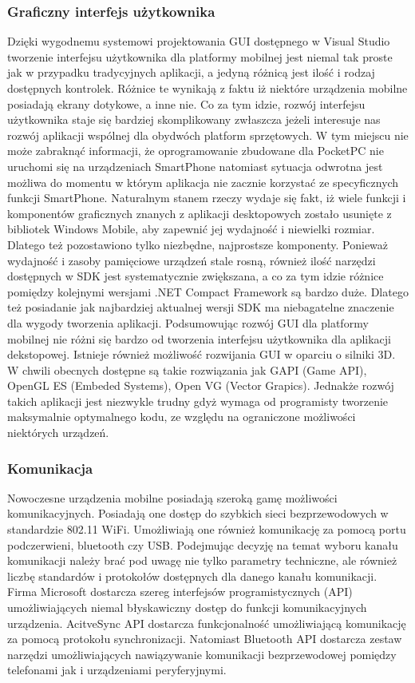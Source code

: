 \subsubsection{Graficzny interfejs użytkownika}
Dzięki wygodnemu systemowi projektowania GUI dostępnego w Visual Studio tworzenie
interfejsu użytkownika dla platformy mobilnej jest niemal tak proste jak w
przypadku tradycyjnych aplikacji, a jedyną różnicą jest ilość i rodzaj dostępnych
kontrolek. Różnice te wynikają z faktu iż niektóre urządzenia mobilne posiadają
ekrany dotykowe, a inne nie. Co za tym idzie, rozwój interfejsu użytkownika staje
się bardziej skomplikowany zwłaszcza jeżeli interesuje nas rozwój aplikacji
wspólnej dla obydwóch platform sprzętowych. W tym miejscu nie może zabraknąć
informacji, że oprogramowanie zbudowane dla PocketPC nie uruchomi się na
urządzeniach SmartPhone natomiast sytuacja odwrotna jest możliwa do momentu w
którym aplikacja nie zacznie korzystać ze specyficznych funkcji SmartPhone.
Naturalnym stanem rzeczy wydaje się fakt, iż wiele funkcji i komponentów
graficznych znanych z aplikacji desktopowych zostało usunięte z bibliotek Windows
Mobile, aby zapewnić jej wydajność i niewielki rozmiar. Dlatego też pozostawiono
tylko niezbędne, najprostsze komponenty. Ponieważ wydajność  i zasoby pamięciowe
urządzeń stale rosną, również ilość narzędzi dostępnych w SDK jest systematycznie
zwiększana, a co za tym idzie różnice pomiędzy kolejnymi wersjami .NET Compact
Framework są bardzo duże. Dlatego też posiadanie jak najbardziej aktualnej wersji
SDK ma niebagatelne znaczenie dla wygody tworzenia aplikacji. Podsumowując rozwój
GUI dla platformy mobilnej nie różni się bardzo od tworzenia interfejsu
użytkownika dla aplikacji dekstopowej. Istnieje również możliwość rozwijania GUI
w oparciu o silniki 3D. W chwili obecnych dostępne są takie rozwiązania jak GAPI
(Game API), OpenGL ES (Embeded Systems), Open VG (Vector Grapics). Jednakże
rozwój takich aplikacji jest niezwykle trudny gdyż wymaga od programisty
tworzenie maksymalnie optymalnego kodu, ze względu na ograniczone możliwości
niektórych urządzeń.

\subsubsection{Komunikacja}
Nowoczesne urządzenia mobilne posiadają szeroką gamę możliwości komunikacyjnych.
Posiadają one dostęp do szybkich sieci bezprzewodowych w standardzie 802.11 WiFi.
Umożliwiają one również komunikację za pomocą portu podczerwieni, bluetooth czy
USB. Podejmując decyzję na temat wyboru kanału komunikacji należy brać pod uwagę
nie tylko parametry techniczne, ale również liczbę standardów i protokołów
dostępnych dla danego kanału komunikacji. Firma Microsoft dostarcza szereg
interfejsów programistycznych (API) umożliwiających niemal błyskawiczny dostęp do
funkcji komunikacyjnych urządzenia. AcitveSync API dostarcza funkcjonalność
umożliwiającą komunikację za pomocą protokołu synchronizacji. Natomiast Bluetooth
API dostarcza zestaw narzędzi umożliwiających nawiązywanie komunikacji
bezprzewodowej pomiędzy telefonami jak i urządzeniami peryferyjnymi.

